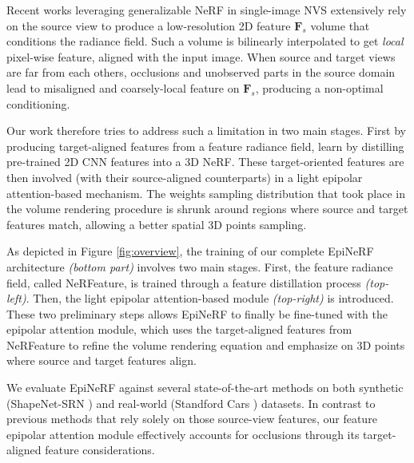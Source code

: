 Recent works \citep{yu2021pixelnerf,li2022symmnerf,lin2023vision} leveraging generalizable NeRF in single-image \ac{NVS} extensively rely on the source view to produce a low-resolution 2D feature $\textbf{F}_{s}$ volume that conditions the radiance field. Such a volume is bilinearly interpolated to get \textit{local} pixel-wise feature, aligned with the input image. When source and target views are far from each others, occlusions and unobserved parts in the source domain lead to misaligned and coarsely-local feature on $\textbf{F}_{s}$, producing a non-optimal conditioning. 

Our work therefore tries to address such a limitation in two main stages. First by producing target-aligned features from a feature radiance field, learn by distilling pre-trained 2D \ac{CNN} features into a 3D \ac{NeRF}. These target-oriented features are then involved (with their source-aligned counterparts) in a light epipolar attention-based mechanism. The weights sampling distribution that took place in the volume rendering procedure is shrunk around regions where source and target features match, allowing a better spatial 3D points sampling.

As depicted in Figure \ref{fig:overview}, the training of our complete EpiNeRF architecture \textit{(bottom part)} involves two main stages.  First, the feature radiance field, called NeRFeature, is trained through a feature distillation process \textit{(top-left)}. Then, the light epipolar attention-based module \textit{(top-right)} is introduced. These two preliminary steps allows EpiNeRF to finally be fine-tuned with the epipolar attention module, which uses the target-aligned features from NeRFeature to refine the volume rendering equation and emphasize on 3D points where source and target features align.
 
We evaluate EpiNeRF against several state-of-the-art methods on both synthetic (ShapeNet-SRN \citep{sitzmann2019scene}) and real-world (Standford Cars \citep{krause20133d}) datasets. In contrast to previous methods that rely solely on those source-view features, our feature epipolar attention module effectively accounts for occlusions through its target-aligned feature considerations. 


